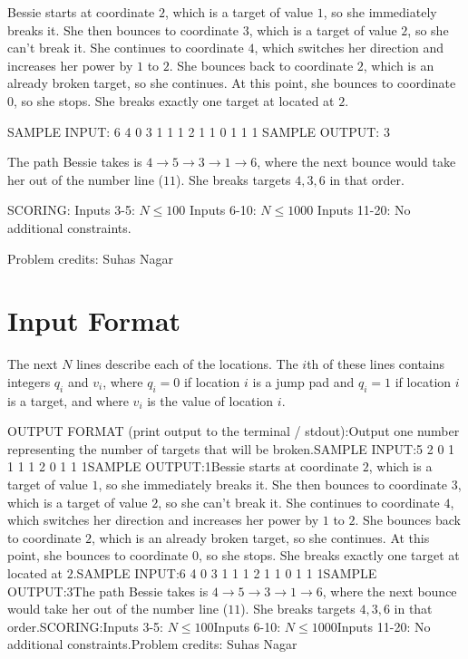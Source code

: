 \documentclass[12pt]{article}
\begin{document}
Bessie starts at coordinate $2$, which is a target of value $1$, so she
immediately breaks it. She then bounces to coordinate $3$, which is a target of
value $2$, so she can't break it. She continues to coordinate $4$, which
switches her direction and increases her power by $1$ to $2$. She bounces back
to coordinate $2$, which is an already broken target, so she continues. At this
point, she bounces to coordinate $0$, so she stops. She breaks exactly one
target at located at $2$.

SAMPLE INPUT:
6 4
0 3
1 1
1 2
1 1
0 1
1 1
SAMPLE OUTPUT: 
3

The path Bessie takes is $4\to 5\to 3\to 1\to 6$, where the next bounce would
take her out of the number line ($11$). She breaks targets $4, 3, 6$ in that
order.

SCORING:
Inputs 3-5: $N \le 100$ Inputs 6-10: $N \le 1000$ Inputs
11-20: No additional constraints. 


Problem credits: Suhas Nagar



\section*{Input Format}
The next $N$ lines describe each of the locations. The $i$th of these lines
contains integers $q_i$ and $v_i$, where $q_i = 0$ if location $i$ is a jump pad
and  $q_i = 1$ if location $i$ is a target, and where $v_i$ is the value of
location $i$.

OUTPUT FORMAT (print output to the terminal / stdout):Output one number representing the number of targets that will be broken.SAMPLE INPUT:5 2
0 1
1 1
1 2
0 1
1 1SAMPLE OUTPUT:1Bessie starts at coordinate $2$, which is a target of value $1$, so she
immediately breaks it. She then bounces to coordinate $3$, which is a target of
value $2$, so she can't break it. She continues to coordinate $4$, which
switches her direction and increases her power by $1$ to $2$. She bounces back
to coordinate $2$, which is an already broken target, so she continues. At this
point, she bounces to coordinate $0$, so she stops. She breaks exactly one
target at located at $2$.SAMPLE INPUT:6 4
0 3
1 1
1 2
1 1
0 1
1 1SAMPLE OUTPUT:3The path Bessie takes is $4\to 5\to 3\to 1\to 6$, where the next bounce would
take her out of the number line ($11$). She breaks targets $4, 3, 6$ in that
order.SCORING:Inputs 3-5: $N \le 100$Inputs 6-10: $N \le 1000$Inputs
11-20: No additional constraints.Problem credits: Suhas Nagar
\end{document}
